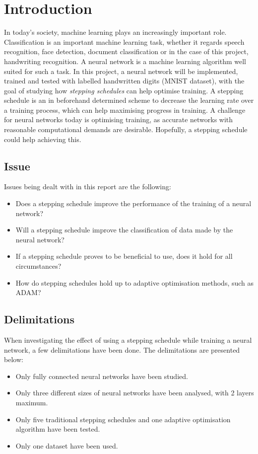 \documentclass{article}
\begin{document}
\newpage
\tableofcontents
\newpage
\section{Introduction}
In today's society, machine learning plays an increasingly important role. Classification is an important machine learning task, whether it regards speech recognition, face detection, document classification or in the case of this project, handwriting recognition. A neural network is a machine learning algorithm well suited for such a task. In this project, a neural network will be implemented, trained and tested with labelled handwritten digits (MNIST dataset), with the goal of studying how \textit{stepping schedules} can help optimise training. A stepping schedule is an in beforehand determined scheme to decrease the learning rate over a training process, which can help maximising progress in training. A challenge for neural networks today is optimising training, as accurate networks with reasonable computational demands are desirable. Hopefully, a stepping schedule could help achieving this.
\subsection{Issue}
Issues being dealt with in this report are the following:

\begin{itemize}\label{issueList}
  \item Does a stepping schedule improve the performance of the training of a neural network? 
  \item Will a stepping schedule improve the classification of data made by the neural network?
  \item If a stepping schedule proves to be beneficial to use, does it hold for all circumstances?
  \item How do stepping schedules hold up to adaptive optimisation methods, such as ADAM?
\end{itemize}

\subsection{Delimitations}

When investigating the effect of using a stepping schedule while training a neural network, a few delimitations have been done. The delimitations are presented below:

\begin{itemize}
    \item Only fully connected neural networks have been studied.
    \item Only three different sizes of neural networks have been analysed, with 2 layers maximum.
    \item Only five traditional stepping schedules and one adaptive optimisation algorithm have been tested.
    \item Only one dataset have been used.
\end{itemize}
\end{document}
